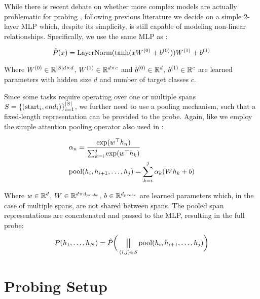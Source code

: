 While there is recent debate on whether more complex models are actually problematic for probing \cite{pimentel-etal-2020-information}, following previous literature \cite{Tenney2019WhatDY,tenney-etal-2019-bert, hewitt-liang-2019-designing} we decide on a simple $2$-layer MLP which, despite its simplicity, is still capable of modeling non-linear relationships.
Specifically, we use the same MLP as \cite{Tenney2019WhatDY}:

\begin{equation}
    \hat{P}(x) = \text{LayerNorm}(\text{tanh}(x W^{(0)} + b^{(0)})) W^{(1)} + b^{(1)}
\end{equation}

Where $W^{(0)} \in \mathbb{R}^{|S| d \times d}$,  $W^{(1)} \in \mathbb{R}^{d \times c}$ and $b^{(0)} \in \mathbb{R}^{d}$,  $b^{(1)} \in \mathbb{R}^{c}$ are learned parameters with hidden size $d$ and number of target classes $c$.

Since some tasks require operating over one or multiple spans $S=\{(\text{start}_i, {end}_i)\}_{i=1}^{|S|}$, we further need to use a pooling mechanism, such that a fixed-length representation can be provided to the probe.
Again, like \cite{Tenney2019WhatDY} we employ the simple attention pooling operator also used in \cite{lee-etal-2017-end, lee-etal-2018-higher}:

\begin{equation}
    \begin{aligned}
         & \alpha_n = \frac{\exp(w^\top h_n)}{\sum_{k=i}^j{\exp(w^\top h_k)}}   \\
         & \text{pool}(h_i, h_{i+1},\dots, h_j)= \sum_{k=i}^j\alpha_k (W h_k + b)
    \end{aligned}
\end{equation}

Where $w \in \mathbb{R}^{d}$, $W \in \mathbb{R}^{d \times d_{probe}}$, $b \in \mathbb{R}^{d_{probe}}$ are learned parameters which, in the case of multiple spans, are not shared between spans. The pooled span representations are concatenated and passed to the MLP, resulting in the full probe:
\begin{equation}
    P(h_1,\dots, h_N) = \hat{P}\bigg(\bigparallel_{(i, j) \in S}{\text{pool}(h_i, h_{i+1},\dots, h_j)}\bigg)
\end{equation}

\section{Probing Setup}
